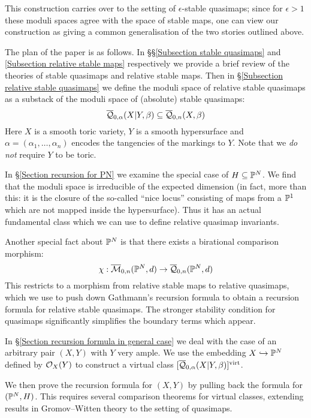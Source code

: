 This construction carries over to the setting of $\epsilon$-stable quasimaps; since for $\epsilon > 1$ these moduli spaces agree with the space of stable maps, one can view our construction as giving a common generalisation of the two stories outlined above.

The plan of the paper is as follows. In \S\S \ref{Subsection stable quasimaps} and \ref{Subsection relative stable maps} respectively we provide a brief review of the theories of stable quasimaps and relative stable maps. Then in \S \ref{Subsection relative stable quasimaps} we define the moduli space of relative stable quasimaps as a substack of the moduli space of (absolute) stable quasimaps:
\begin{equation*} \overline{\mathcal Q}_{0,\alpha}(X|Y,\beta) \subseteq \overline{\mathcal Q}_{0,n}(X,\beta) \end{equation*}
Here $X$ is a smooth toric variety, $Y$ is a smooth hypersurface and $\alpha = (\alpha_1, \ldots, \alpha_n)$ encodes the tangencies of the markings to $Y$. Note that we \emph{do not} require $Y$ to be toric.

In \S \ref{Section recursion for PN} we examine the special case of $H \subseteq \mathbb P^N$. We find that the moduli space is irreducible of the expected dimension (in fact, more than this: it is the closure of the so-called ``nice locus'' consisting of maps from a $\mathbb P^1$ which are not mapped inside the hypersurface). Thus it has an actual fundamental class which we can use to define relative quasimap invariants.

Another special fact about $\mathbb P^N$ is that there exists a birational comparison morphism:
\begin{equation*} \chi : \overline{\mathcal M}_{0,n}(\mathbb P^N,d) \rightarrow \overline{\mathcal Q}_{0,n}(\mathbb P^N,d) \end{equation*}
This restricts to a morphism from relative stable maps to relative quasimaps, which we use to push down Gathmann's recursion formula to obtain a recursion formula for relative stable quasimaps. The stronger stability condition for quasimaps significantly simplifies the boundary terms which appear.

In \S \ref{Section recursion formula in general case} we deal with the case of an arbitrary pair $(X,Y)$ with $Y$ very ample. We use the embedding $X \hookrightarrow \mathbb P^N$ defined by $\mathcal{O}_X(Y)$ to construct a virtual class $[\overline{\mathcal Q}_{0,\alpha}(X|Y,\beta)]^{\operatorname{virt}}$.

We then prove the recursion formula for $(X,Y)$ by pulling back the formula for $(\mathbb P^N,H)$. This requires several comparison theorems for virtual classes, extending results in Gromov--Witten theory to the setting of quasimaps.

